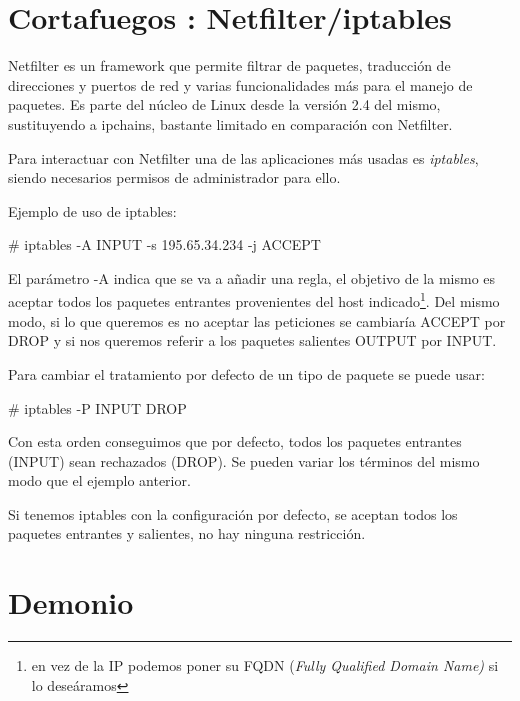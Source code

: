 \section{Cortafuegos : Netfilter/iptables}
\label{sec:introduction:iptables}

Netfilter es un framework que permite filtrar de paquetes, traducci\'on de direcciones y puertos de red y varias funcionalidades m\'as para el manejo de paquetes. Es parte del n\'ucleo de Linux desde la versi\'on 2.4 del mismo, sustituyendo a ipchains, bastante limitado en comparaci\'on con Netfilter.
\newline


Para interactuar con Netfilter una de las aplicaciones más usadas es \emph{iptables}\cite{iptables:2004}, siendo necesarios permisos de administrador para ello.
\newline

Ejemplo de uso de iptables:

\begin{center}
    \# iptables -A INPUT -s 195.65.34.234 -j ACCEPT\\
\end{center}


El par\'ametro -A indica que se va a a\~nadir una regla, el objetivo de la mismo es aceptar todos los paquetes entrantes provenientes del host indicado\footnote{en vez de la IP podemos poner su FQDN (\emph{Fully Qualified Domain Name)} si lo deseáramos}. Del mismo modo, si lo que queremos es no aceptar las peticiones se cambiar\'ia ACCEPT por DROP y si nos queremos referir a los paquetes salientes OUTPUT por INPUT.
\newline

Para cambiar el tratamiento por defecto de un tipo de paquete se puede usar:

\begin{center}
    \# iptables -P INPUT DROP\\
\end{center}

Con esta orden conseguimos que por defecto, todos los paquetes entrantes (INPUT) sean rechazados (DROP). Se pueden variar los términos del mismo modo que el ejemplo anterior.
\newline


Si tenemos iptables con la configuración por defecto, se aceptan todos los paquetes entrantes y salientes, no hay ninguna restricción.




\section{Demonio}

